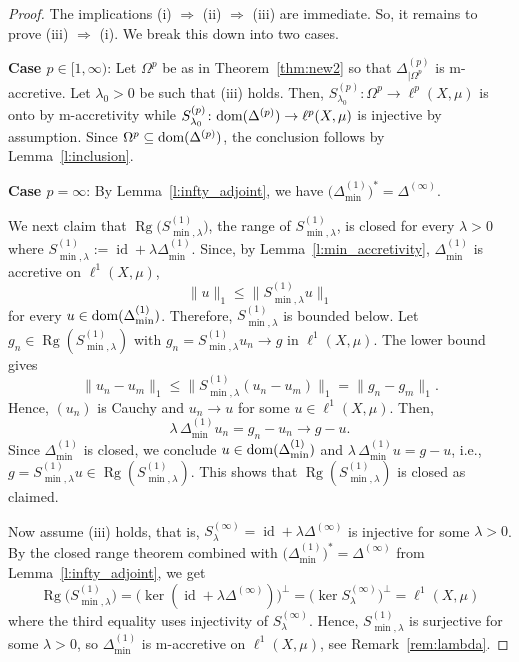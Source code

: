 \documentclass[letterpaper]{article}
\theoremstyle{definition}
\theoremstyle{named}
\numberwithin{equation}{section}
\newcommand{\lm}{\lambda}
\newcommand{\dom}{\textnormal{dom}} %
\newcommand{\id}{\operatorname{id}}
\newcommand{\Dep}{\Delta^{(p)}}
\begin{document}
\begin{proof}
The implications (i) $\Longrightarrow$ (ii) $\Longrightarrow$ (iii) are immediate. So, it remains to prove (iii) $\Longrightarrow$ (i). We break this down into two cases.

\medskip
\noindent \textbf{Case $p\in [1,\infty)$}:
Let $\Omega^p$ be as in Theorem~\ref{thm:new2} so that $\Delta^{(p)}_{|\Omega^p}$ is m-accretive.
Let $\lambda_0 >0$ be such that (iii) holds. Then, $S^{(p)}_{\lm_0}\colon \Omega^p \to \ell^p(X,\mu)$
is onto by m-accretivity while $S^{(p)}_{\lm_0}\colon \dom(\Delta^{(p)}) \to \ell^p(X,\mu)$ is injective
by assumption.
Since $\Omega^p \subseteq \dom(\Dep)$, the conclusion follows by Lemma~\ref{l:inclusion}.


\medskip
\noindent \textbf{Case $p=\infty$}: 
By Lemma~\ref{l:infty_adjoint}, we have
$\bigl(\Delta_{\min}^{(1)}\bigr)^{\ast}=\Delta^{(\infty)}$.



We next claim that $\operatorname{Rg}\bigl(S^{(1)}_{\min, \lambda}\bigr)$, the
range of $S^{(1)}_{\min, \lambda}$,
is closed for every $\lambda>0$ where $S^{(1)}_{\min, \lambda}:=\id+\lambda\Delta_{\min}^{(1)}$.
Since, by Lemma~\ref{l:min_accretivity}, $\Delta_{\min}^{(1)}$ is accretive on $\ell^1(X,\mu)$,
\[
\|u\|_1\le \|S^{(1)}_{\min, \lambda} u\|_1
\]
for every $u\in\dom(\Delta_{\min}^{(1)})$.
Therefore, $S^{(1)}_{\min, \lambda}$ is bounded below. 
Let $g_n \in \operatorname{Rg}(S^{(1)}_{\min, \lambda})$ with $g_n=S^{(1)}_{\min, \lambda} u_n\to g$ in $\ell^1(X,\mu)$. The lower bound gives
\[
\|u_n-u_m\|_1\le \|S^{(1)}_{\min, \lambda}(u_n-u_m)\|_1=\|g_n-g_m\|_1.
\]
Hence, $(u_n)$ is Cauchy and $u_n\to u$ for some $u\in\ell^1(X,\mu)$. Then,
\[
\lambda\,\Delta_{\min}^{(1)} u_n=g_n-u_n\to g-u.
\]
Since $\Delta_{\min}^{(1)}$ is closed, we conclude $u\in\dom(\Delta_{\min}^{(1)})$ and $\lambda\,\Delta_{\min}^{(1)} u=g-u$, i.e., $g=S^{(1)}_{\min, \lambda} u\in\operatorname{Rg}(S^{(1)}_{\min, \lambda})$. This shows that $\operatorname{Rg}(S^{(1)}_{\min, \lambda})$ 
is closed as claimed.


Now assume (iii) holds, that is, $S^{(\infty)}_\lambda= \id +\lambda\Delta^{(\infty)}$ is injective for some $\lambda>0$. By the closed range theorem combined with $\bigl(\Delta_{\min}^{(1)}\bigr)^{\ast}=\Delta^{(\infty)}$ from Lemma~\ref{l:infty_adjoint}, we get
\[
\operatorname{Rg}\bigl(S^{(1)}_{\min, \lambda}\bigr)
=\bigl(\ker(\id+\lambda\Delta^{(\infty)})\bigr)^{\perp}
=\bigl(\ker S^{(\infty)}_\lambda\bigr)^{\perp}
=\ell^1(X,\mu)
\]
where the third equality uses injectivity of $S^{(\infty)}_\lambda$. Hence, $S^{(1)}_{\min, \lambda}$ is surjective for some $\lambda>0$, so $\Delta_{\min}^{(1)}$ is m-accretive on $\ell^1(X,\mu)$, see Remark~\ref{rem:lambda}.


\end{proof}
\end{document}
